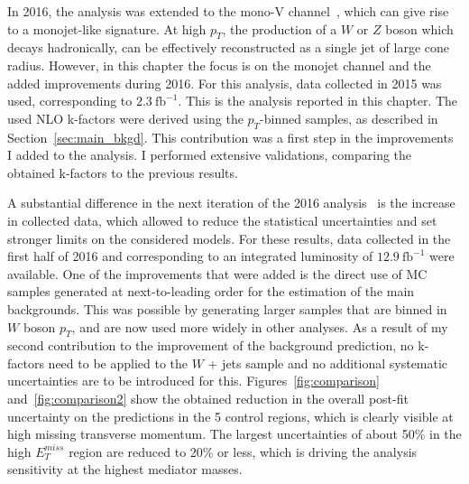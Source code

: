 In 2016, the analysis was extended to the mono-V channel~\cite{CMS:2016tns}, which can give rise to a monojet-like signature. At high $p_T$, the production of a $W$ or $Z$ boson which decays hadronically, can be effectively reconstructed as a single jet of large cone radius. However, in this chapter the focus is on the monojet channel and the added improvements during 2016. For this analysis, data collected in 2015 was used, corresponding to $2.3\ \mathrm{fb}^{-1}$. This is the analysis reported in this chapter.  The used \ac{NLO} k-factors were derived using the $p_T$-binned samples, as described in Section~\ref{sec:main_bkgd}. This contribution was a first step in the improvements I added to the analysis. I performed extensive validations, comparing the obtained k-factors to the previous results. 

A substantial difference in the next iteration of the 2016 analysis~\cite{Sirunyan:2017hci} is the increase in collected data, which allowed to reduce the statistical uncertainties and set stronger limits on the considered models. For these results, data collected in the first half of 2016 and corresponding to an integrated luminosity of $12.9\ \mathrm{fb}^{-1}$ were available. One of the improvements that were added is the direct use of MC samples generated at next-to-leading order for the estimation of the main backgrounds. This was possible by generating larger samples that are binned in $W$ boson $p_T$, and are now used more widely in other analyses. As a result of my second contribution to the improvement of the background prediction, no k-factors need to be applied to the $W$ + jets sample and no additional systematic uncertainties are to be introduced for this. Figures~\ref{fig:comparison} and~\ref{fig:comparison2} show the obtained reduction in the overall post-fit uncertainty on the predictions in the 5 control regions, which is clearly visible at high missing transverse momentum. The largest uncertainties of about 50\% in the high $E_T^{miss}$ region are reduced to 20\% or less, which is driving the analysis sensitivity at the highest mediator masses.

